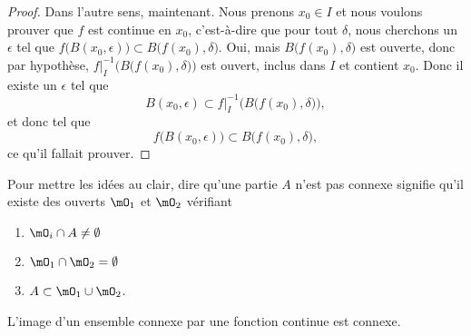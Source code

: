 \begin{proof}
	Dans l'autre sens, maintenant. Nous prenons \( x_0\in I\) et nous voulons prouver que \( f\) est continue en \( x_0\), c'est-à-dire que pour tout \( \delta\), nous cherchons un \( \epsilon\) tel que \( f\big( B(x_0,\epsilon) \big)\subset B\big( f(x_0),\delta \big)\). Oui, mais \( B\big( f(x_0),\delta \big)\) est ouverte, donc par hypothèse, \( f|_I^{-1}\Big( B\big( f(x_0),\delta \big) \Big)\) est ouvert, inclus dans \( I\) et contient \( x_0\). Donc il existe un \( \epsilon\) tel que
	\[
		B(x_0,\epsilon)\subset f|_I^{-1}\Big( B\big( f(x_0),\delta \big) \Big),
	\]
	et donc tel que
	\[
		f\big( B(x_0,\epsilon) \big)\subset B\big( f(x_0),\delta \big),
	\]
	ce qu'il fallait prouver.
\end{proof}

\begin{normaltext}      \label{NORMooSCAWooPFnrVj}
    Pour mettre les idées au clair, dire qu'une partie \( A\) n'est pas connexe signifie qu'il existe des ouverts \( \mO_1\) et \( \mO_2\) vérifiant
    \begin{enumerate}
        \item   \label{ITEMooRACDooKLaVXP}
        \( \mO_i\cap A\neq\emptyset\)
    \item       \label{ITEMooNCQVooNjAYCT}
        \( \mO_1\cap\mO_2=\emptyset\)
    \item       \label{ITEMooPIHJooNJYpQo}
        \( A\subset  \mO_1\cup\mO_2  \).
    \end{enumerate}
\end{normaltext}

\begin{lemma}   \label{LemConncontconn}
	L'image d'un ensemble connexe par une fonction continue est connexe.
\end{lemma}

